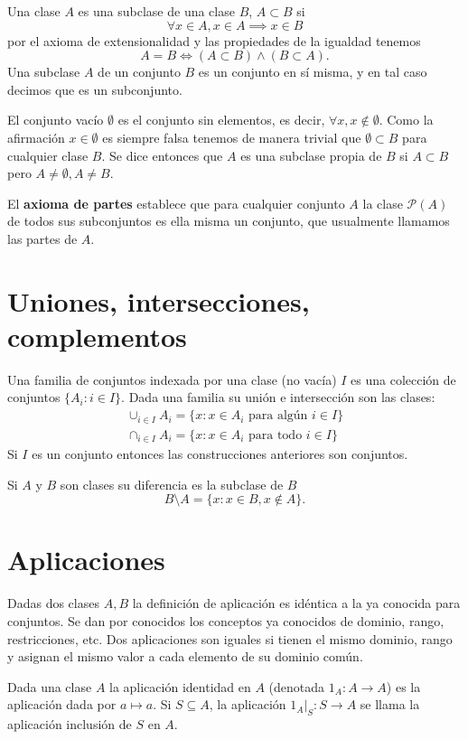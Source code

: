 Una clase $A$ es una subclase de una clase $B$, $A \subset B$ si 
\[
\forall x \in A, x \in A \implies x \in B
\]
por el axioma de extensionalidad y las propiedades de la igualdad tenemos
\[
A=B \iff (A \subset B) \land (B \subset A).
\] 
Una subclase $A$ de un conjunto $B$ es un conjunto en sí misma, y en tal caso decimos que es un subconjunto.

El conjunto vacío $\emptyset$ es el conjunto sin elementos, es decir, $\forall x, x \notin \emptyset$. Como la afirmación $x\in\emptyset$ es siempre falsa tenemos de manera trivial que $\emptyset \subset B$ para cualquier clase $B$. Se dice entonces que $A$ es una subclase propia de $B$ si $A\subset B$ pero $A\neq\emptyset, A \neq B$.

El \textbf{axioma de partes} establece que para cualquier conjunto $A$ la clase $\mathcal{P}(A)$ de todos sus subconjuntos es ella misma un conjunto, que usualmente llamamos las partes de $A$.

\section{Uniones, intersecciones, complementos}

Una familia de conjuntos indexada por una clase (no vacía) $I$ es una colección de conjuntos $\{A_i : i \in I\}$. Dada una familia su unión e intersección son las clases:
\begin{align*}
\cup_{i\in I} A_i = \{x : x\in A_i \text{ para algún } i\in I \}\\
\cap_{i\in I} A_i = \{x : x\in A_i \text{ para todo } i\in I \}
\end{align*}
Si $I$ es un conjunto entonces las construcciones anteriores son conjuntos.

Si $A$ y $B$ son clases su diferencia es la subclase de $B$
\[
B \setminus A = \{x : x \in B, x \notin A\}.
\]

\section{Aplicaciones}

Dadas dos clases $A,B$ la definición de aplicación es idéntica a la ya conocida para conjuntos. Se dan por conocidos los conceptos ya conocidos de dominio, rango, restricciones, etc. Dos aplicaciones son iguales si tienen el mismo dominio, rango y asignan el mismo valor a cada elemento de su dominio común.

Dada una clase $A$ la aplicación identidad en \( A \) (denotada \( 1_A: A \to A \)) es la aplicación dada por \( a \mapsto a \). Si \( S \subseteq A \), la aplicación \( 1_A|_S: S \to A \) se llama la aplicación inclusión de \( S \) en \( A \).

